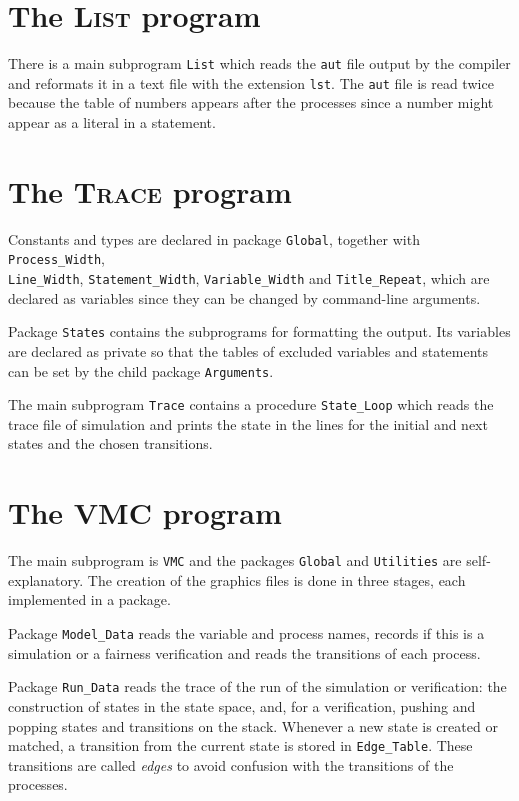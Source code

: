 \documentclass[11pt]{article}
\newcommand*{\trc}{\textsc{Trace}}
\newcommand*{\lst}{\textsc{List}}
\newcommand*{\vmc}{\textsc{VMC}}
\newcommand*{\p}[1]{\texttt{#1}}
\begin{document}
\section{The \lst{} program}

There is a main subprogram \p{List} which reads the \p{aut} file output
by the compiler and reformats it in a text file with the extension
\p{lst}. The \p{aut} file is read twice because the table of numbers
appears after the processes since a number might appear as a literal in
a statement.

\newpage

\section{The \trc{} program}

Constants and types are declared in package \p{Global}, together with
\p{Process\_Width},\\ \p{Line\_Width}, \p{Statement\_Width},
\p{Variable\_Width} and \p{Title\_Repeat}, which are declared as
variables since they can be changed by command-line arguments.

Package \p{States} contains the subprograms for formatting the output.
Its variables are declared as private so that the tables of excluded
variables and statements can be set by the child package \p{Arguments}.

The main subprogram \p{Trace} contains a procedure \p{State\_Loop} which
reads the trace file of simulation and prints the state in the lines for
the initial and next states and the chosen transitions.

\section{The \vmc{} program}

The main subprogram is \p{VMC} and the packages \p{Global} and
\p{Utilities} are self-explanatory. The creation of the graphics files
is done in three stages, each implemented in a package.

Package \p{Model\_Data} reads the variable and process names, records if
this is a simulation or a fairness verification and reads the
transitions of each process.

Package \p{Run\_Data} reads the trace of the run of the simulation or
verification: the construction of states in the state space, and, for a
verification, pushing and popping states and transitions on the stack.
Whenever a new state is created or matched, a transition from the
current state is stored in \p{Edge\_Table}. These transitions are called
\emph{edges} to avoid confusion with the transitions of the processes.
\end{document}
